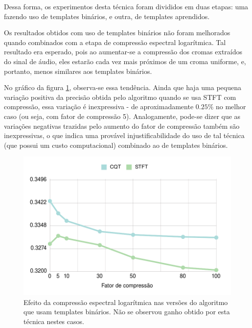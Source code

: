         Dessa forma, os experimentos desta técnica foram divididos em duas etapas: uma fazendo uso de templates binários, e outra, de templates aprendidos.
        
        Os resultados obtidos com uso de templates binários não foram melhorados quando combinados com a etapa de compressão espectral logarítmica. Tal resultado era esperado, pois ao aumentar-se a compressão dos cromas extraídos do sinal de áudio, eles estarão cada vez mais próximos de um croma uniforme, e, portanto, menos similares aos templates binários.
        
        No gráfico da figura \ref{fig:exp:bin-compressao}, observa-se essa tendência. Ainda que haja uma pequena variação positiva da precisão obtida pelo algoritmo quando se usa STFT com compressão, essa variação é inexpressiva - de aproximadamente ${0.25}\%$ no melhor caso (ou seja, com fator de compressão 5). Analogamente, pode-se dizer que as variações negativas trazidas pelo aumento do fator de compressão também são inexpressivas, o que indica uma provável injustificabilidade do uso de tal técnica (que possui um custo computacional) combinado ao de templates binários.
        
        \begin{figure}[h]
            \begin{center}
                \includegraphics[width=13cm]{figuras/bin-compressao.png}
                \caption{\label{fig:exp:bin-compressao}Efeito da compressão espectral logarítmica nas versões do algoritmo que usam templates binários. Não se observou ganho obtido por esta técnica nestes casos.}
            \end{center}
        \end{figure}
        
